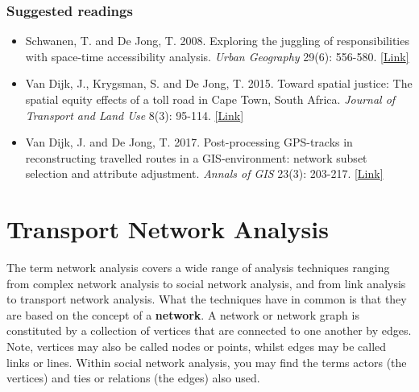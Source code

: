 \documentclass[
  letterpaper,
  DIV=11,
  numbers=noendperiod]{scrreprt}
\providecommand{\tightlist}{%
  \setlength{\itemsep}{0pt}\setlength{\parskip}{0pt}}\usepackage{longtable,booktabs,array}
\begin{document}
\hypertarget{suggested-readings-1}{%
\subsubsection*{Suggested readings}\label{suggested-readings-1}}

\begin{itemize}
\tightlist
\item
  Schwanen, T. and De Jong, T. 2008. Exploring the juggling of
  responsibilities with space-time accessibility analysis. \emph{Urban
  Geography} 29(6): 556-580.
  \href{https://doi.org/10.2747/0272-3638.29.6.556}{{[}Link{]}}
\item
  Van Dijk, J., Krygsman, S. and De Jong, T. 2015. Toward spatial
  justice: The spatial equity effects of a toll road in Cape Town, South
  Africa. \emph{Journal of Transport and Land Use} 8(3): 95-114.
  \href{https://doi.org/10.5198/jtlu.2015.555}{{[}Link{]}}
\item
  Van Dijk, J. and De Jong, T. 2017. Post-processing GPS-tracks in
  reconstructing travelled routes in a GIS-environment: network subset
  selection and attribute adjustment. \emph{Annals of GIS} 23(3):
  203-217.
  \href{https://doi.org/10.1080/19475683.2017.1340340}{{[}Link{]}}
\end{itemize}

\hypertarget{transport-network-analysis-1}{%
\section{Transport Network
Analysis}\label{transport-network-analysis-1}}

The term network analysis covers a wide range of analysis techniques
ranging from complex network analysis to social network analysis, and
from link analysis to transport network analysis. What the techniques
have in common is that they are based on the concept of a
\textbf{network}. A network or network graph is constituted by a
collection of vertices that are connected to one another by edges. Note,
vertices may also be called nodes or points, whilst edges may be called
links or lines. Within social network analysis, you may find the terms
actors (the vertices) and ties or relations (the edges) also used.
\end{document}
